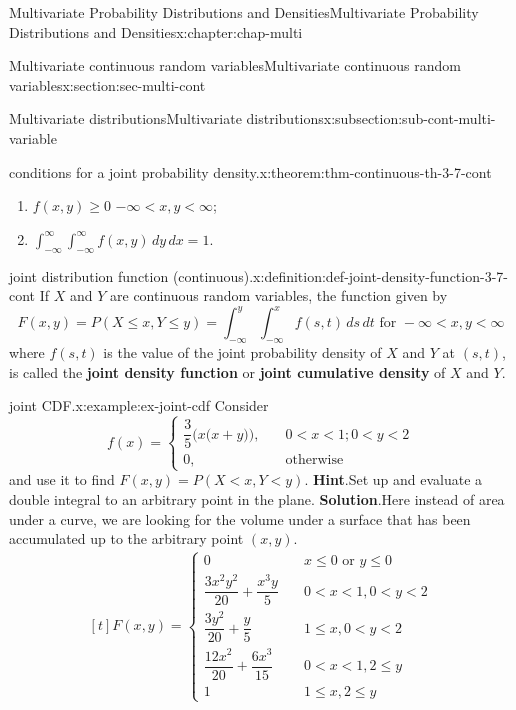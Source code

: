 \documentclass[oneside,10pt,]{book}
\newcommand{\blocktitlefont}{\relax}
\newcommand{\terminology}[1]{\textbf{#1}}
\numberwithin{equation}{section}
\newcommand{\lt}{<}
\newcommand{\amp}{&}
\begin{document}
\begin{chapterptx}{Multivariate Probability Distributions and Densities}{}{Multivariate Probability Distributions and Densities}{}{}{x:chapter:chap-multi}
\begin{sectionptx}{Multivariate continuous random variables}{}{Multivariate continuous random variables}{}{}{x:section:sec-multi-cont}
\begin{subsectionptx}{Multivariate distributions}{}{Multivariate distributions}{}{}{x:subsection:sub-cont-multi-variable}
\begin{theorem}{conditions for a joint probability density.}{}{x:theorem:thm-continuous-th-3-7-cont}
\begin{enumerate}
\item{}\(f(x, y) \ge 0\)  \(-\infty \lt x, y\lt \infty\);%
\item{}\(\displaystyle\int_{-\infty}^\infty\int_{-\infty}^\infty f(x, y) \,dy\,dx=1\).%
\end{enumerate}
%
\end{theorem}
\begin{definition}{joint distribution function (continuous).}{x:definition:def-joint-density-function-3-7-cont}%
If \(X\) and \(Y\) are continuous random variables, the function given by%
\begin{equation*}
F(x, y) = P(X \le x, Y \le y) = \int_{-\infty}^y\int_{-\infty}^x f(s, t)
\,ds\,dt\text{ for } -\infty \lt x, y \lt \infty
\end{equation*}
where \(f(s,
t)\) is the value of the joint probability density of \(X\) and \(Y\) at \((s, t)\), is called the \terminology{joint density function} or \terminology{joint cumulative density} of \(X\) and \(Y\).%
\end{definition}
\begin{example}{joint CDF.}{x:example:ex-joint-cdf}%
Consider%
\begin{equation*}
f(x) = \begin{cases}\dfrac{3}{5}\Big(x\Big(x+y\Big)\Big),\amp \quad 0 \lt x \lt 1; 0 \lt y \lt 2\\
0,\amp \quad \text{otherwise}\end{cases}
\end{equation*}
and use it to find \(F(x, y) = P(X \lt x, Y \lt y)\).%
\textbf{\blocktitlefont Hint}.\quad{}Set up and evaluate a double integral to an arbitrary point in the plane.%
\textbf{\blocktitlefont Solution}.\quad{}Here instead of area under a curve, we are looking for the volume under a surface that has been accumulated up to the arbitrary point \((x, y)\).%
\begin{equation*}
\begin{aligned}[t]
F(x,y) = 
\begin{cases}
0 \amp \quad x\le 0\text{ or }y\le 0\\
\dfrac{3x^2y^2}{20} + \dfrac{x^3y}{5} \amp \quad 0 \lt x \lt 1, 0 \lt y \lt 2\\
\dfrac{3y^2}{20}+\dfrac{y}{5} \amp \quad  1\le x, 0 \lt y \lt 2\\
\dfrac{12x^2}{20} +\dfrac{6x^3}{15} \amp \quad 0 \lt x \lt 1, 2\le y\\
1 \amp \quad 1\le x, 2\le y
\end{cases}

\end{aligned}
\end{equation*}
\end{example}
\end{subsectionptx}
\end{sectionptx}
\end{chapterptx}
\end{document}
